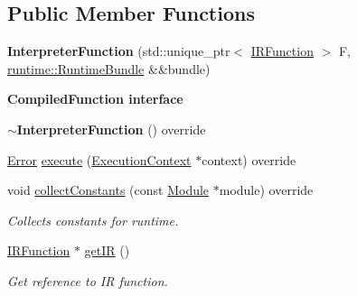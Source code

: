\subsection*{Public Member Functions}
\begin{DoxyCompactItemize}
\item 
\mbox{\label{classglow_1_1_interpreter_function_a2b1f2de082a6b0feae25bca71a51c4f7}} 
{\bfseries Interpreter\+Function} (std\+::unique\+\_\+ptr$<$ \hyperlink{classglow_1_1_i_r_function}{I\+R\+Function} $>$ F, \hyperlink{classglow_1_1runtime_1_1_runtime_bundle}{runtime\+::\+Runtime\+Bundle} \&\&bundle)
\end{DoxyCompactItemize}
\begin{Indent}\textbf{ Compiled\+Function interface}\par
\begin{DoxyCompactItemize}
\item 
\mbox{\label{classglow_1_1_interpreter_function_aec3c7725bb28dae2397f551253b44973}} 
{\bfseries $\sim$\+Interpreter\+Function} () override
\item 
\hyperlink{namespaceglow_afdb176c3a672ef66db0ecfc19a8d39bf}{Error} \hyperlink{classglow_1_1_interpreter_function_a6bc0763da64f449b7fda842397fc7c86}{execute} (\hyperlink{classglow_1_1_execution_context}{Execution\+Context} $\ast$context) override
\item 
\mbox{\label{classglow_1_1_interpreter_function_a56fad079c3c368071d79141a286950a2}} 
void \hyperlink{classglow_1_1_interpreter_function_a56fad079c3c368071d79141a286950a2}{collect\+Constants} (const \hyperlink{classglow_1_1_module}{Module} $\ast$module) override
\begin{DoxyCompactList}\small\item\em Collects constants for runtime. \end{DoxyCompactList}\item 
\mbox{\label{classglow_1_1_interpreter_function_aa01cf9cae2fa9a8aba7c539960dab04f}} 
\hyperlink{classglow_1_1_i_r_function}{I\+R\+Function} $\ast$ \hyperlink{classglow_1_1_interpreter_function_aa01cf9cae2fa9a8aba7c539960dab04f}{get\+IR} ()
\begin{DoxyCompactList}\small\item\em Get reference to IR function. \end{DoxyCompactList}\item 

\end{DoxyCompactItemize}
\end{Indent}
